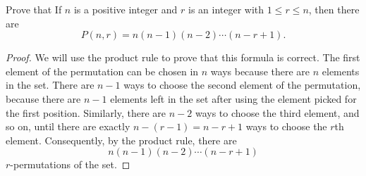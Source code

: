         \begin{exercise}
            Prove that If $n$ is a positive integer and $r$ is an integer with $1\leq r\leq n$, then there are
            $$
            P(n,r)=n(n-1)(n-2)\cdots(n-r+1).
            $$
        \end{exercise}
        \begin{proof}
            We will use the product rule to prove that this formula is correct. The first element of the permutation can be chosen in $n$ ways because there are $n$ elements in the set. There are $n-1$ ways to choose the second element of the permutation, because there are $n-1$ elements left in the set after using the element picked for the first position. Similarly, there are $n-2$ ways to choose the third element, and so on, until there are exactly $n-(r-1)=n-r+1$ ways to choose the $r$th element. Consequently, by the product rule, there are
            $$
            n(n-1)(n-2)\cdots(n-r+1)
            $$
            $r$-permutations of the set.
        \end{proof}

